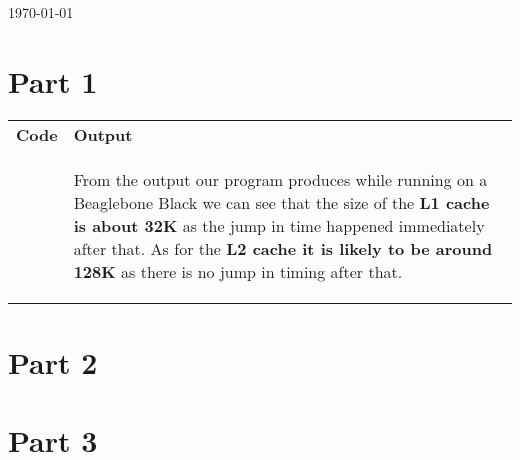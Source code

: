 \documentclass[letterpaper,12pt,titlepage]{article}
\begin{document}
\begin{titlepage}

{\large \today}\\[3cm] %


 

\vfill %

\end{titlepage}
\section*{Part 1}
\begin{tabular}{p{9.5cm} p{6cm} }
 \textbf{Code} & \textbf{Output} \\ \vspace{-0.5cm}
 & \vspace{-0.5cm}   
\begin{mdframed}[style=MyFrame]From the output our program produces while running on a Beaglebone Black we can see that the size of the \textbf{L1 cache is about 32K} as the jump in time happened immediately after that. As for the \textbf{L2 cache it is likely to be around 128K} as there is no jump in timing after that. \end{mdframed}
\end{tabular}

\section*{Part 2}

 

\newpage
\section*{Part 3}
 
\end{document}
